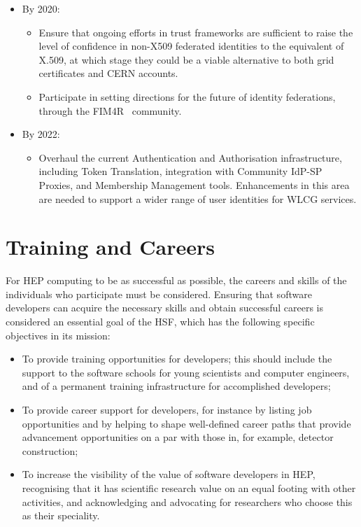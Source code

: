 \begin{itemize}
\item
By 2020:
\begin{itemize}
\item
  Ensure that ongoing efforts in trust frameworks are sufficient to
  raise the level of confidence in non-X509 federated identities to the
  equivalent of X.509, at which stage they could be a viable alternative
  to both grid certificates and CERN accounts.
\item
  Participate in setting directions for the future of identity
  federations, through the FIM4R~\cite{FIM4R} community.
\end{itemize}
\item
By 2022:
\begin{itemize}
\item
  Overhaul the current Authentication and Authorisation infrastructure,
  including Token Translation, integration with Community IdP-SP
  Proxies, and Membership Management tools. Enhancements in this area
  are needed to support a wider range of user identities for WLCG
  services.
\end{itemize}
\end{itemize}

\hypertarget{training-and-careers}{%
\section{Training and Careers}\label{training-and-careers}}

For HEP computing to be as successful as possible, the careers and
skills of the individuals who participate must be considered. Ensuring
that software developers can acquire the necessary skills and obtain
successful careers is considered an essential goal of the HSF, which has
the following specific objectives in its mission:

\begin{itemize}
\item
  To provide training opportunities for developers; this should include
  the support to the software schools for young scientists and computer
  engineers, and of a permanent training infrastructure for accomplished
  developers;
\item
  To provide career support for developers, for instance by listing job
  opportunities and by helping to shape well-defined career paths that
  provide advancement opportunities on a par with those in, for example,
  detector construction;
\item
  To increase the visibility of the value of software developers in HEP,
  recognising that it has scientific research value on an equal footing
  with other activities, and acknowledging and advocating for researchers
  who choose this as their speciality.
\end{itemize}

